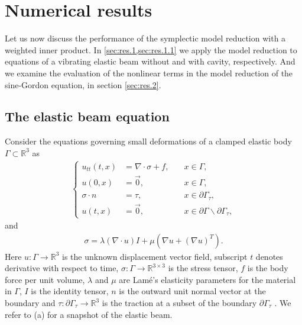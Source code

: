 \section{Numerical results} \label{sec:res}
Let us now discuss the performance of the symplectic model reduction with a weighted inner product. In \cref{sec:res.1,sec:res.1.1} we apply the model reduction to equations of a vibrating elastic beam without and with cavity, respectively. And we examine the evaluation of the nonlinear terms in the model reduction of the sine-Gordon equation, in section \cref{sec:res.2}.

\subsection{The elastic beam equation} \label{sec:res.1}
Consider the equations governing small deformations of a clamped elastic body $\Gamma\subset \mathbb R^{3}$ as 
\begin{eqnarray} \label{eq:res.1}
\left\{
\begin{aligned}
	u_{tt}(t,x) &= \nabla \cdot \sigma + f, \quad & x\in \Gamma, \\
	u(0,x) &= \vec 0, & x\in \Gamma,\\
	\sigma \cdot n &= \tau, & x \in \partial \Gamma_\tau,\\
	u(t,x) &= \vec 0, & x \in\partial \Gamma \backslash \partial \Gamma_\tau,
\end{aligned}
\right.
\end{eqnarray}
and
\begin{eqnarray}  \label{eq:res.2}
	\sigma = \lambda (\nabla \cdot u) I + \mu(\nabla u + (\nabla u)^T).
\end{eqnarray}
Here $u:\Gamma \to \mathbb{R}^3$ is the unknown displacement vector field, subscript $t$ denotes derivative with respect to time, $\sigma:\Gamma \to \mathbb{R}^{3\times 3}$ is the stress tensor, $f$ is the body force per unit volume, $\lambda$ and $\mu$ are Lam\'e's elasticity parameters for the material in $\Gamma$, $I$ is the identity tensor, $n$ is the outward unit normal vector at the boundary and $\tau:\partial \Gamma_\tau \to \mathbb R^3$ is the traction at a subset of the boundary $\partial \Gamma_\tau$ \cite{langtangen2017solving}. We refer to (a) for a snapshot of the elastic beam.

